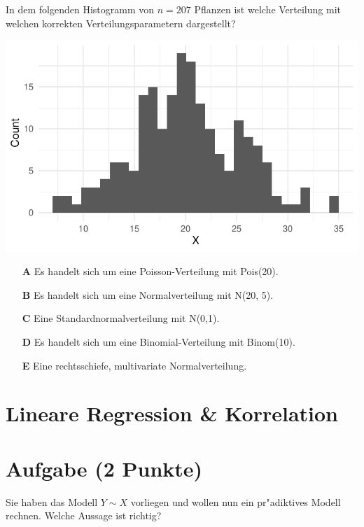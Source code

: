 \documentclass[a4paper, 9pt]{scrartcl}\usepackage[]{graphicx}\usepackage[]{xcolor}
\makeatletter
\def\maxwidth{ %
  \ifdim\Gin@nat@width>\linewidth
    \linewidth
  \else
    \Gin@nat@width
  \fi
}
\makeatother
\begin{document}
In dem folgenden Histogramm von $n = 207$ Pflanzen ist welche
Verteilung mit welchen korrekten Verteilungsparametern dargestellt?



{\centering \includegraphics[width=\maxwidth]{img/mc-distribution-02-a-1} 

}







\begin{enumerate}
\item [\textbf{A} \msquare] Es handelt sich um eine Poisson-Verteilung mit Pois(20).
\item [\textbf{B} \msquare] Es handelt sich um eine Normalverteilung mit N(20, 5).
\item [\textbf{C} \msquare] Eine Standardnormalverteilung mit N(0,1).
\item [\textbf{D} \msquare] Es handelt sich um eine Binomial-Verteilung mit Binom(10).
\item [\textbf{E} \msquare] Eine rechtsschiefe, multivariate Normalverteilung.
\end{enumerate} 
\section*{Lineare Regression \& Korrelation}

\section{Aufgabe \hfill (2 Punkte)}




Sie haben das Modell $Y \sim X$ vorliegen und wollen nun ein
pr{"a}diktives Modell rechnen. Welche Aussage ist richtig?
\end{document}

